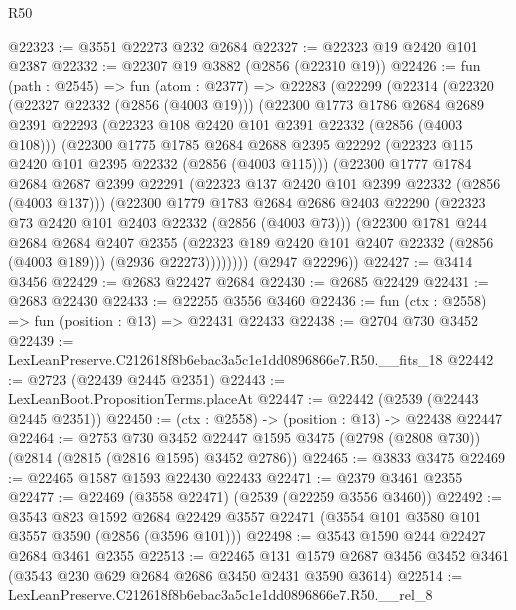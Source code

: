\begin{lexlean}{R50}
\begin{coremodule}
@22323 := @3551 @22273 @232 @2684
@22327 := @22323 @19 @2420 @101 @2387
@22332 := @22307 @19 @3882 (@2856 (@22310 @19))
@22426 := fun (path : @2545) =>
  fun (atom : @2377) =>
  @22283
    (@22299
      (@22314
        (@22320
          (@22327 @22332 (@2856 (@4003 @19)))
          (@22300
            @1773
            @1786
            @2684
            @2689
            @2391
            @22293
            (@22323 @108 @2420 @101 @2391 @22332 (@2856 (@4003 @108)))
            (@22300
              @1775
              @1785
              @2684
              @2688
              @2395
              @22292
              (@22323 @115 @2420 @101 @2395 @22332 (@2856 (@4003 @115)))
              (@22300
                @1777
                @1784
                @2684
                @2687
                @2399
                @22291
                (@22323 @137 @2420 @101 @2399 @22332 (@2856 (@4003 @137)))
                (@22300
                  @1779
                  @1783
                  @2684
                  @2686
                  @2403
                  @22290
                  (@22323 @73 @2420 @101 @2403 @22332 (@2856 (@4003 @73)))
                  (@22300
                    @1781
                    @244
                    @2684
                    @2684
                    @2407
                    @2355
                    (@22323 @189 @2420 @101 @2407 @22332 (@2856 (@4003 @189)))
                    (@2936 @22273))))))))
      (@2947 @22296))
@22427 := @3414 @3456
@22429 := @2683 @22427 @2684
@22430 := @2685 @22429
@22431 := @2683 @22430
@22433 := @22255 @3556 @3460
@22436 := fun (ctx : @2558) => fun (position : @13) => @22431 @22433
@22438 := @2704 @730 @3452
@22439 := LexLeanPreserve.C212618f8b6ebac3a5c1e1dd0896866e7.R50.__fits_18
@22442 := @2723 (@22439 @2445 @2351)
@22443 := LexLeanBoot.PropositionTerms.placeAt
@22447 := @22442 (@2539 (@22443 @2445 @2351))
@22450 := (ctx : @2558) -> (position : @13) -> @22438 @22447
@22464 := @2753
    @730
    @3452
    @22447
    @1595
    @3475
    (@2798 (@2808 @730))
    (@2814 (@2815 (@2816 @1595) @3452 @2786))
@22465 := @3833 @3475
@22469 := @22465 @1587 @1593 @22430 @22433
@22471 := @2379 @3461 @2355
@22477 := @22469 (@3558 @22471) (@2539 (@22259 @3556 @3460))
@22492 := @3543
    @823
    @1592
    @2684
    @22429
    @3557
    @22471
    (@3554 @101 @3580 @101 @3557 @3590 (@2856 (@3596 @101)))
@22498 := @3543 @1590 @244 @22427 @2684 @3461 @2355
@22513 := @22465
    @131
    @1579
    @2687
    @3456
    @3452
    @3461
    (@3543 @230 @629 @2684 @2686 @3450 @2431 @3590 @3614)
@22514 := LexLeanPreserve.C212618f8b6ebac3a5c1e1dd0896866e7.R50.__rel_8

\end{coremodule}
\end{lexlean}
